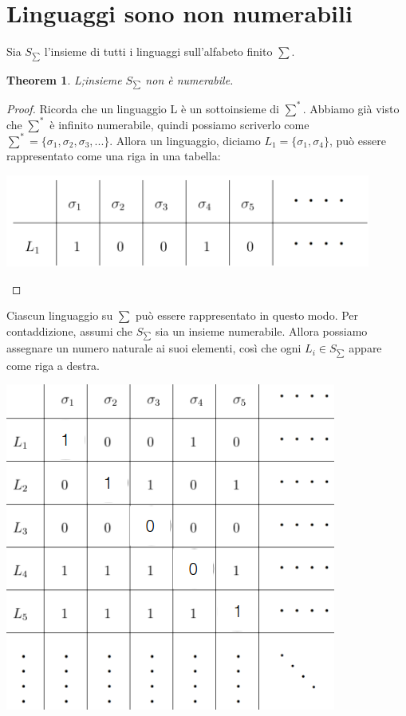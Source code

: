 \documentclass[a4paper, 12pt]{article}
\newtheorem{theorem}{Theorem}[section]
\begin{document}
\section{Linguaggi sono non numerabili}

Sia $S_{\sum}$ l'insieme di tutti i linguaggi sull'alfabeto finito $\sum$.
\begin{theorem}
L;insieme $S_{\sum}$ non \`e numerabile.
\end{theorem}
\begin{proof}
Ricorda che un linguaggio L \`e un sottoinsieme di $\sum^*$. Abbiamo gi\`a visto che $\sum^*$ \`e infinito numerabile, quindi possiamo scriverlo come $\sum^* = \{\sigma_1, \sigma_2,\sigma_3,...\}$. Allora un linguaggio, diciamo $L_1 = \{\sigma_1,\sigma_4\}$, pu\`o essere rappresentato come una riga in una tabella:\\
\begin{center}
\includegraphics[scale=0.5]{tabella_linguaggi.png}

\end{center}
\end{proof}
Ciascun linguaggio su $\sum$ pu\`o essere rappresentato in questo modo. Per contaddizione, assumi che $S_{\sum}$ sia un insieme numerabile. Allora possiamo assegnare un numero naturale ai suoi elementi, cos\`i che ogni $L_i \in S_{\sum}$ appare come riga a destra.\\ \begin{center}
\includegraphics[scale=0.5]{tabella_linguaggi2.png}
\end{center}
\end{document}
